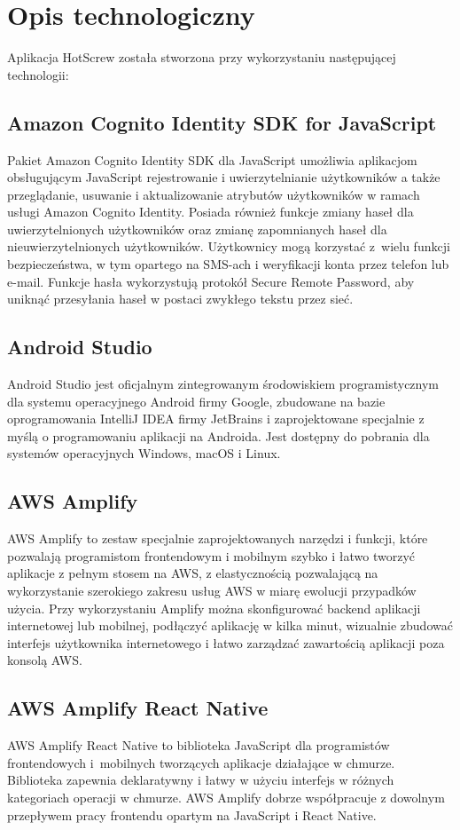 \documentclass[12pt,a4paper]{article}
\begin{document}
	\section{Opis technologiczny}
	\indent Aplikacja HotScrew została stworzona przy wykorzystaniu następującej technologii:
		\subsection{Amazon Cognito Identity SDK for JavaScript}
			\indent Pakiet Amazon Cognito Identity SDK dla JavaScript umożliwia aplikacjom obsługującym JavaScript rejestrowanie i uwierzytelnianie użytkowników a także przeglądanie,
			usuwanie i aktualizowanie atrybutów użytkowników w ramach usługi Amazon Cognito Identity. Posiada również funkcje zmiany haseł dla uwierzytelnionych użytkowników
			oraz zmianę zapomnianych haseł dla nieuwierzytelnionych	użytkowników. Użytkownicy mogą korzystać z~wielu funkcji bezpieczeństwa, w tym opartego na SMS-ach
			i weryfikacji konta przez telefon lub e-mail. Funkcje hasła wykorzystują protokół Secure Remote Password, aby uniknąć przesyłania haseł w postaci zwykłego tekstu przez sieć.
		\subsection{Android Studio}
			\indent Android Studio jest oficjalnym zintegrowanym środowiskiem programistycznym dla systemu operacyjnego Android firmy Google, zbudowane na bazie oprogramowania IntelliJ IDEA
			firmy JetBrains i zaprojektowane specjalnie z myślą o programowaniu aplikacji na Androida. Jest dostępny do pobrania dla systemów operacyjnych Windows, macOS i Linux.
		\subsection{AWS Amplify}
			\indent AWS Amplify to zestaw specjalnie zaprojektowanych narzędzi i funkcji, które pozwalają programistom frontendowym i mobilnym szybko i łatwo tworzyć aplikacje
			z pełnym stosem na AWS, z elastycznością pozwalającą na wykorzystanie szerokiego zakresu usług AWS w miarę ewolucji przypadków użycia.
			Przy wykorzystaniu Amplify można skonfigurować backend aplikacji internetowej lub mobilnej, podłączyć aplikację w kilka minut, wizualnie zbudować interfejs użytkownika
			internetowego i łatwo zarządzać zawartością aplikacji poza konsolą AWS.
		\subsection{AWS Amplify React Native}
			\indent AWS Amplify React Native to biblioteka JavaScript dla programistów frontendowych i~mobilnych tworzących aplikacje działające w chmurze. Biblioteka zapewnia
		deklaratywny i łatwy w użyciu interfejs w różnych kategoriach operacji w chmurze. AWS Amplify dobrze współpracuje z dowolnym przepływem pracy frontendu opartym
		na JavaScript i React Native.
\end{document}
